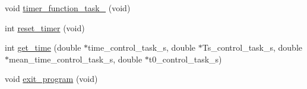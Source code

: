\begin{DoxyCompactItemize}
\item 
void \hyperlink{main2_01_07C_xC3_xB3pia_01em_01conflito_01de_01Caio_01Gustavo_01Mesquita_01Angelo_012013-05-17_08_8c_a01c18e97a4488be2912eb738b2e7f890}{timer\-\_\-function\-\_\-task\-\_} (void)
\item 
int \hyperlink{main2_01_07C_xC3_xB3pia_01em_01conflito_01de_01Caio_01Gustavo_01Mesquita_01Angelo_012013-05-17_08_8c_a97a188c3a74115770124cf0bf0c1e407}{reset\-\_\-timer} (void)
\item 
int \hyperlink{main2_01_07C_xC3_xB3pia_01em_01conflito_01de_01Caio_01Gustavo_01Mesquita_01Angelo_012013-05-17_08_8c_a5b2b1fdd5e517470c10e84a2b2bcc5c8}{get\-\_\-time} (double $\ast$time\-\_\-control\-\_\-task\-\_\-s, double $\ast$Ts\-\_\-control\-\_\-task\-\_\-s, double $\ast$mean\-\_\-time\-\_\-control\-\_\-task\-\_\-s, double $\ast$t0\-\_\-control\-\_\-task\-\_\-s)
\item 
void \hyperlink{main2_01_07C_xC3_xB3pia_01em_01conflito_01de_01Caio_01Gustavo_01Mesquita_01Angelo_012013-05-17_08_8c_a5f05ce725141ddfab683e059b1cd95ea}{exit\-\_\-program} (void)
\end{DoxyCompactItemize}
